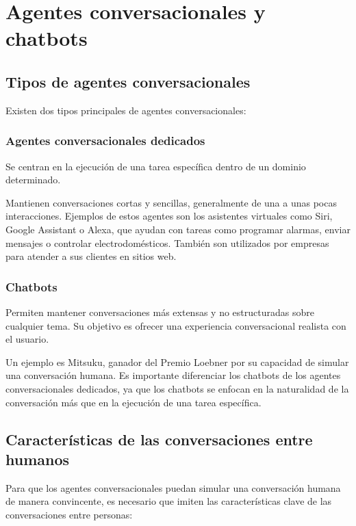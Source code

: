 \documentclass{report}
\def\profundidadIndiceCapitulo{subsubsection}
\begin{document}
\chapter {Agentes conversacionales y chatbots}
\etocframedstyle[1]{}
\etocsetnexttocdepth{\profundidadIndiceCapitulo}
\localtableofcontents


\section{Tipos de agentes conversacionales}
Existen dos tipos principales de agentes conversacionales:

\subsection{Agentes conversacionales dedicados}
Se centran en la ejecución de una tarea específica dentro de un dominio determinado.

Mantienen conversaciones cortas y sencillas, generalmente de una a unas pocas interacciones.  Ejemplos de estos agentes son los asistentes virtuales como Siri, Google Assistant o Alexa, que ayudan con tareas como programar alarmas, enviar mensajes o controlar electrodomésticos.
También son utilizados por empresas para atender a sus clientes en sitios web.

\subsection{Chatbots}
Permiten mantener conversaciones más extensas y no estructuradas sobre cualquier tema.
Su objetivo es ofrecer una experiencia conversacional realista con el usuario.

Un ejemplo es Mitsuku, ganador del Premio Loebner por su capacidad de simular una conversación humana. 
Es importante diferenciar los chatbots de los agentes conversacionales dedicados, ya que los chatbots se enfocan en la naturalidad de la conversación más que en la ejecución de una tarea específica.

\section{Características de las conversaciones entre humanos}
Para que los agentes conversacionales puedan simular una conversación humana de manera convincente, es necesario que imiten las características clave de las conversaciones entre personas:
\end{document}
